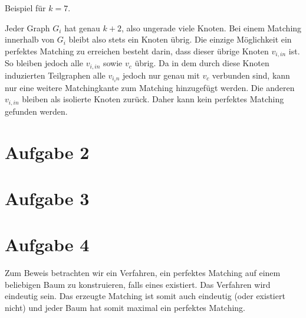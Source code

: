 \documentclass[a4paper]{article}
\begin{document}
Beispiel für $k=7$.


Jeder Graph $G_i$ hat genau $k+2$, also ungerade viele Knoten. Bei einem
Matching innerhalb von $G_i$ bleibt also stets ein Knoten übrig.
Die einzige Möglichkeit ein perfektes Matching zu erreichen besteht darin,
dass dieser übrige Knoten $v_{i, in}$ ist. So bleiben jedoch alle $v_{i,
in}$ sowie $v_c$ übrig. Da in dem durch diese Knoten induzierten Teilgraphen
alle $v_{i_in}$ jedoch nur genau mit $v_c$ verbunden sind, kann nur eine
weitere Matchingkante zum Matching hinzugefügt werden. Die anderen $v_{i,
in}$ bleiben als isolierte Knoten zurück. 
Daher kann kein perfektes Matching gefunden werden.

\section{Aufgabe 2}
\section{Aufgabe 3}

\section{Aufgabe 4}

Zum Beweis betrachten wir ein Verfahren, ein perfektes Matching auf einem
beliebigen Baum zu konstruieren, falls eines existiert. Das Verfahren wird
eindeutig sein. Das erzeugte Matching ist somit auch eindeutig (oder 
existiert nicht) und jeder Baum hat somit maximal ein perfektes Matching.
\end{document}
